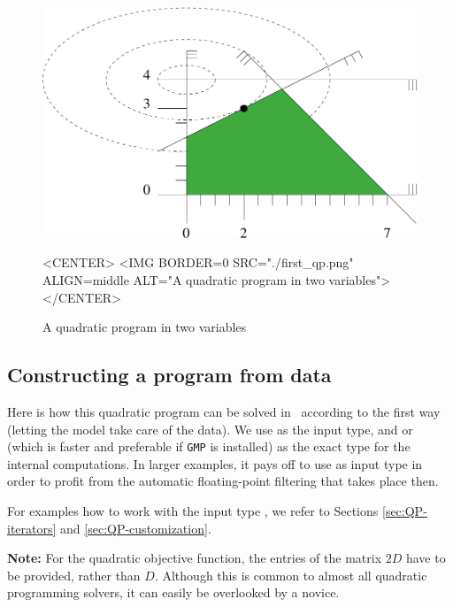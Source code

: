 \begin{figure}[htbp]
\begin{ccTexOnly}
\begin{center}
\includegraphics{QP_solver/first_qp} %
\end{center}
\end{ccTexOnly}

\begin{ccHtmlOnly}
<CENTER>
<IMG BORDER=0 SRC="./first_qp.png" ALIGN=middle ALT="A quadratic program in two variables">
</CENTER>
\end{ccHtmlOnly}

\caption{A quadratic program in two variables
\label{fig:QP-first_qp}}
\end{figure}

\subsection{Constructing a program from data}
Here is how this quadratic program can be solved in \cgal\ 
according to the first way (letting the model take care of
the data). We use  as the input type, and 
 or  (which is faster and preferable if
\texttt{GMP} is installed) as the exact type for the
internal computations. In larger examples, it pays off to use
 as input type in order to profit from the 
automatic floating-point filtering that takes place then.

For examples 
how to work with the input type , we refer to 
Sections \ref{sec:QP-iterators} and \ref{sec:QP-customization}.

{\bf Note:} For the quadratic objective function, the entries 
of the matrix $2D$ have to be provided, rather than $D$. Although 
this is common to almost all quadratic programming solvers, it 
can easily be overlooked by a novice.

